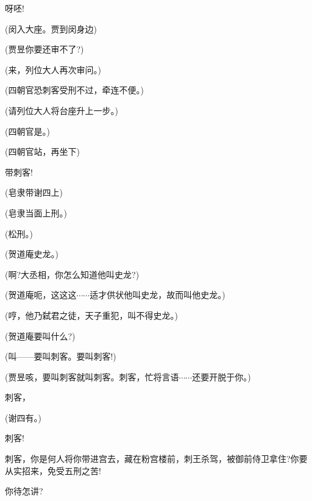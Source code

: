 {呀呸!



(闵入大座。贾到闵身边)

(贾昱\hspace{30pt}你要还审不了?)


(来，列位大人再次审问。)

(四朝官\hspace{20pt}恐刺客受刑不过，牵连不便。)

(请列位大人将台座升上一步。)

(四朝官\hspace{20pt}是。)

({\hwfs 四}朝官{\hwfs 站}，{\hwfs 再坐下})

带刺客!

(皂隶{\hwfs 带}谢四{\hwfs 上})

(皂隶\hspace{30pt}当面上刑。)

(松刑。)

(贺道庵\hspace{20pt}史龙。)

(啊?大丞相，你怎么知道他叫史龙?)

(贺道庵\hspace{20pt}呃，这这这$\cdots{}\cdots{}$适才供状他叫史龙，故而叫他史龙。)

(哼，他乃弑君之徒，天子重犯，叫不得史龙。)

(贺道庵\hspace{20pt}要叫什么?)

(叫------要叫刺客。要叫刺客!)

(贾昱\hspace{30pt}咳，要叫刺客就叫刺客。刺客，忙将言语$\cdots{}\cdots{}$还要开脱于你。)

刺客，

(谢四\hspace{30pt}有。)

刺客!

刺客，你是何人将你带进宫去，藏在粉宫楼前，刺王杀驾，被御前侍卫拿住?你要从实招来，免受{五刑}之苦!

你待怎讲?

}
